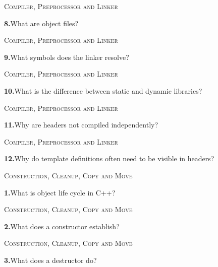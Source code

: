 \documentclass[11pt,a4paper]{article}
\newenvironment{questionblock}{%
  \begin{minipage}[t][0.455\textheight][t]{\textwidth}%
  \raggedright\small
}{%
  \vfill
  \end{minipage}%
}
\newcommand{\sectionlabel}[1]{\textsc{#1}\par\vspace{0.35em}}
\newcommand{\questionnumber}[1]{\textbf{#1.}\enspace}
\begin{document}
\vspace*{0.04\textheight}
\begin{questionblock}
\sectionlabel{Compiler, Preprocessor and Linker}
\questionnumber{8}What are object files?\par
\end{questionblock}
\newpage
\begin{questionblock}
\sectionlabel{Compiler, Preprocessor and Linker}
\questionnumber{9}What symbols does the linker resolve?\par
\end{questionblock}
\vspace*{0.04\textheight}
\begin{questionblock}
\sectionlabel{Compiler, Preprocessor and Linker}
\questionnumber{10}What is the difference between static and dynamic libraries?\par
\end{questionblock}
\newpage
\begin{questionblock}
\sectionlabel{Compiler, Preprocessor and Linker}
\questionnumber{11}Why are headers not compiled independently?\par
\end{questionblock}
\vspace*{0.04\textheight}
\begin{questionblock}
\sectionlabel{Compiler, Preprocessor and Linker}
\questionnumber{12}Why do template definitions often need to be visible in headers?\par

\end{questionblock}
\newpage
\begin{questionblock}
\sectionlabel{Construction, Cleanup, Copy and Move}
\questionnumber{1}What is object life cycle in C++?\par
\end{questionblock}
\vspace*{0.04\textheight}
\begin{questionblock}
\sectionlabel{Construction, Cleanup, Copy and Move}
\questionnumber{2}What does a constructor establish?\par
\end{questionblock}
\newpage
\begin{questionblock}
\sectionlabel{Construction, Cleanup, Copy and Move}
\questionnumber{3}What does a destructor do?\par
\end{questionblock}
\vspace*{0.04\textheight}
\end{document}
